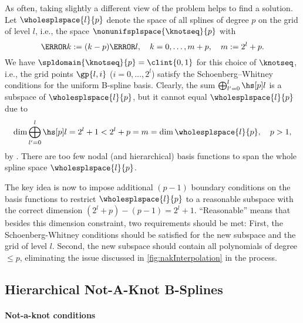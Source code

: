 As often, taking slightly a different view of the problem helps
to find a solution.
Let $\wholesplspace{l}{p}$ denote the space of all splines of degree $p$
on the grid of level $l$, i.e., the space $\nonunifsplspace{\knotseq}{p}$ with
\begin{equation}
  \label{eq:fullGridKnots}
  \knot{k} := (k - p) \ms{l},\quad
  k = 0, \dotsc, m + p,\quad
  m := 2^l + p.
\end{equation}
We have $\spldomain{\knotseq}{p} = \clint{0, 1}$ for this choice of $\knotseq$, i.e.,
the grid points $\gp{l,i}$ ($i = 0, \dotsc, 2^l$) satisfy
the Schoenberg--Whitney conditions for the uniform B-spline basis.
Clearly, the sum $\bigoplus_{l'=0}^l \hsbspl{l}{p}$ is a subspace of $\wholesplspace{l}{p}$,
but it cannot equal $\wholesplspace{l}{p}$ due to
\begin{equation}
  \dim \bigoplus_{l'=0}^l \hsbspl{l}{p}
  = 2^l + 1
  < 2^l + p
  = m
  = \dim \wholesplspace{l}{p},\quad
  p > 1,
\end{equation}
by .
There are too few nodal (and hierarchical) basis functions to
span the whole spline space $\wholesplspace{l}{p}$.

The key idea is now to impose additional $(p - 1)$ boundary conditions
on the basis functions to restrict $\wholesplspace{l}{p}$ to a reasonable subspace
with the correct dimension $(2^l + p) - (p - 1) = 2^l + 1$.
``Reasonable'' means that besides this dimension constraint,
two requirements should be met:
First, the Schoenberg-Whitney conditions should be satisfied for
the new subspace and the grid of level $l$.
Second, the new subspace should contain all polynomials of degree $\le p$,
eliminating the issue discussed in \cref{fig:nakInterpolation}
in the process.



\subsection{Hierarchical Not-A-Knot B-Splines}
\label{sec:322NAKBSplines}

\paragraph{Not-a-knot conditions}


